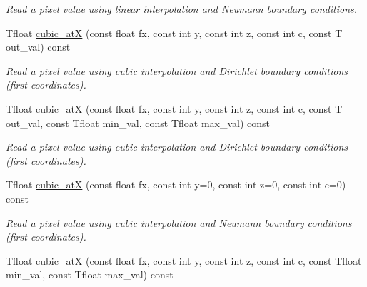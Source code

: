 \begin{DoxyCompactItemize}
\begin{DoxyCompactList}\small\item\em Read a pixel value using linear interpolation and Neumann boundary conditions. \item\end{DoxyCompactList}\item 
\hypertarget{structcimg__library_1_1CImg_aba4bf62598b659f4bb6156f46c9490fb}{
Tfloat \hyperlink{structcimg__library_1_1CImg_aba4bf62598b659f4bb6156f46c9490fb}{cubic\_\-atX} (const float fx, const int y, const int z, const int c, const T out\_\-val) const }
\label{structcimg__library_1_1CImg_aba4bf62598b659f4bb6156f46c9490fb}

\begin{DoxyCompactList}\small\item\em Read a pixel value using cubic interpolation and Dirichlet boundary conditions (first coordinates). \item\end{DoxyCompactList}\item 
\hypertarget{structcimg__library_1_1CImg_af00e68ae5ac82681ea0459103c8831fc}{
Tfloat \hyperlink{structcimg__library_1_1CImg_af00e68ae5ac82681ea0459103c8831fc}{cubic\_\-atX} (const float fx, const int y, const int z, const int c, const T out\_\-val, const Tfloat min\_\-val, const Tfloat max\_\-val) const }
\label{structcimg__library_1_1CImg_af00e68ae5ac82681ea0459103c8831fc}

\begin{DoxyCompactList}\small\item\em Read a pixel value using cubic interpolation and Dirichlet boundary conditions (first coordinates). \item\end{DoxyCompactList}\item 
\hypertarget{structcimg__library_1_1CImg_ab07fa25391006b828414121dd1729dfe}{
Tfloat \hyperlink{structcimg__library_1_1CImg_ab07fa25391006b828414121dd1729dfe}{cubic\_\-atX} (const float fx, const int y=0, const int z=0, const int c=0) const }
\label{structcimg__library_1_1CImg_ab07fa25391006b828414121dd1729dfe}

\begin{DoxyCompactList}\small\item\em Read a pixel value using cubic interpolation and Neumann boundary conditions (first coordinates). \item\end{DoxyCompactList}\item 
\hypertarget{structcimg__library_1_1CImg_a53135e1804c27157eada3d770d3e834d}{
Tfloat \hyperlink{structcimg__library_1_1CImg_a53135e1804c27157eada3d770d3e834d}{cubic\_\-atX} (const float fx, const int y, const int z, const int c, const Tfloat min\_\-val, const Tfloat max\_\-val) const }
\label{structcimg__library_1_1CImg_a53135e1804c27157eada3d770d3e834d}


\end{DoxyCompactItemize}
